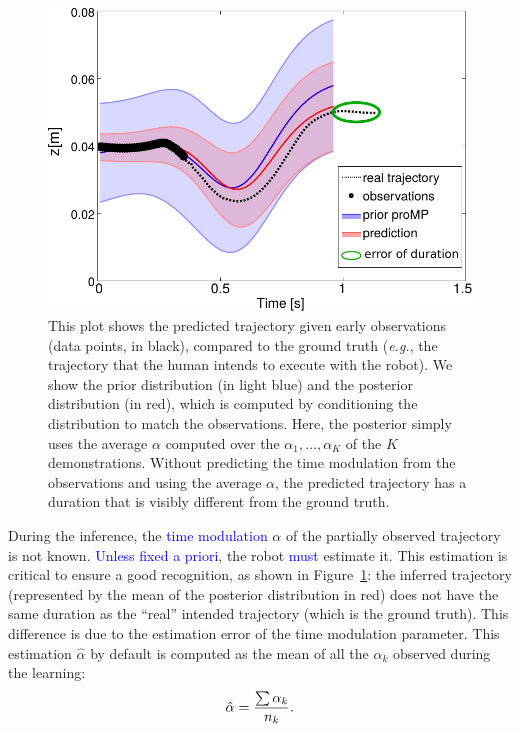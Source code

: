 \documentclass[utf8]{frontiersSCNS} %
\newcommand{\rev}[1]{\textcolor{blue}{#1}}
\newcommand{\todo}[1]{\textcolor{red}{\textbf{/*#1*/}}}
\begin{document}
\begin{figure}[h!]
\centering
\includegraphics[width=13cm]{img/mean_alpha_errV2.pdf}
\caption{This plot shows the predicted trajectory given early observations (data points, in black), compared to the ground truth (\textit{e.g.}, the trajectory that the human intends to execute with the robot). We show the prior distribution (in light blue) and the posterior distribution (in red), which is computed by conditioning the distribution to match the observations. Here, the posterior simply uses the average $\alpha$ computed over the $\alpha_1, \ldots, \alpha_K$ of the $K$ demonstrations. Without predicting the time modulation from the observations and using the average $\alpha$, the predicted trajectory has a duration that is visibly different from the ground truth.}

\label{fig:meanAlpha}
\end{figure}

During the inference, the \rev{time modulation} $\alpha$ of the partially observed trajectory is not known. \rev{Unless fixed a priori}, the robot \rev{must} estimate it. This estimation is critical to ensure a good recognition, as shown in Figure~\ref{fig:meanAlpha}: the inferred trajectory (represented by the mean of the posterior distribution in red) 
does not have the same duration as the ``real'' intended trajectory (which is the ground truth). This difference is due to the estimation error of the time modulation parameter. This estimation $\hat{\alpha}$ by default is  computed as the mean of all the $\alpha_k$ observed during the learning:
\begin{equation}
\label{eq:avg}
\hat{\alpha} = {{\sum \alpha_k} \over n_k} .
\end{equation}
\end{document}
